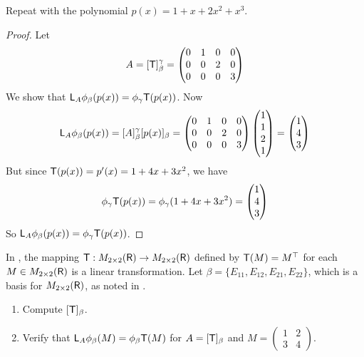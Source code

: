 \begin{exercise} \label{exercise 2.4.18}
Repeat  with the polynomial \(p(x) = 1 + x + 2x^2 + x^3\).
\end{exercise}

\begin{proof}
Let 
\[
    A = [\textsf{T}]_{\beta}^{\gamma} = \begin{pmatrix} 0 & 1 & 0 & 0 \\ 0 & 0 & 2 & 0 \\ 0 & 0 & 0 & 3 \end{pmatrix}
\]
We show that \(\textsf{L}_A \phi_{\beta} (p(x)) = \phi_{\gamma} \textsf{T} (p(x))\).
Now
\[
    \textsf{L}_A \phi_{\beta} (p(x)) = [A]_{\beta}^{\gamma} [p(x)]_{\beta} 
    = \begin{pmatrix} 0 & 1 & 0 & 0 \\ 0 & 0 & 2 & 0 \\ 0 & 0 & 0 & 3 \end{pmatrix} \begin{pmatrix} 1 \\ 1 \\ 2 \\ 1 \end{pmatrix} = \begin{pmatrix} 1 \\ 4 \\ 3 \end{pmatrix}
\]
But since \(\textsf{T}(p(x)) = p'(x) = 1 + 4x + 3x^2\), we have
\[
    \phi_{\gamma} \textsf{T} (p(x)) = \phi_{\gamma} (1 + 4x + 3x^2) = \begin{pmatrix} 1 \\ 4 \\ 3 \end{pmatrix}
\]
So \(\textsf{L}_A \phi_{\beta} (p(x)) = \phi_{\gamma} \textsf{T} (p(x))\).
\end{proof}

\begin{exercise} \label{exercise 2.4.19}
In , the mapping \(\textsf{T} : M_{2 \times 2}(\textsf{R}) \to M_{2 \times 2}(\textsf{R})\) defined by \(\textsf{T}(M) = M^\top\) for each \(M \in M_{2 \times 2}(\textsf{R})\) is a linear transformation.
Let \(\beta = \{ E_{11}, E_{12}, E_{21}, E_{22} \}\), which is a basis for \(M_{2 \times 2}(\textsf{R})\), as noted in .
\begin{enumerate}
\item Compute \([\textsf{T}]_{\beta}\).
\item Verify that \(\textsf{L}_A \phi_{\beta} (M) = \phi_{\beta} \textsf{T}(M)\) for \(A = [\textsf{T}]_{\beta}\) and \(M = \begin{pmatrix} 1 & 2 \\ 3 & 4 \end{pmatrix}\).
\end{enumerate}
\end{exercise}

